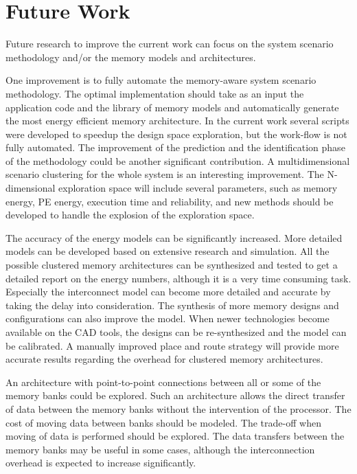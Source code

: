 \section{Future Work}

Future research to improve the current work can focus on the system scenario methodology and/or the memory models and architectures.

One improvement is to fully automate the memory-aware system scenario methodology.
The optimal implementation should take as an input the application code and the library of memory models and automatically generate the most energy efficient memory architecture.
In the current work several scripts were developed to speedup the design space exploration, but the work-flow is not fully automated.
The improvement of the prediction and the identification phase of the methodology could be another significant contribution. 
A multidimensional scenario clustering for the whole system is an interesting improvement.
The N-dimensional exploration space will include several parameters, such as memory energy, PE energy, execution time and reliability, and new methods should be developed to handle the explosion of the exploration space.

The accuracy of the energy models can be significantly increased.
More detailed models can be developed based on extensive research and simulation.
All the possible clustered memory architectures can be synthesized and tested to get a detailed report on the energy numbers, although it is a very time consuming task.
Especially the interconnect model can become more detailed and accurate by taking the delay into consideration.
The synthesis of more memory designs and configurations can also improve the model.
When newer technologies become available on the CAD tools, the designs can be re-synthesized and the model can be calibrated.
A manually improved place and route strategy will provide more accurate results regarding the overhead for clustered memory architectures.

An architecture with point-to-point connections between all or some of the memory banks could be explored. 
Such an architecture allows the direct transfer of data between the memory banks without the intervention of the processor.
The cost of moving data between banks should be modeled.
The trade-off when moving of data is performed should be explored.
The data transfers between the memory banks may be useful in some cases, although the interconnection overhead is expected to increase significantly.




